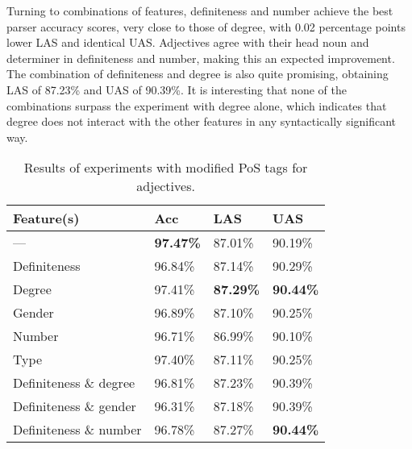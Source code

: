 \documentclass[11pt,a4paper]{article}
\begin{document}

Turning to combinations of features, definiteness and number achieve the best
parser accuracy scores, very close to those of degree, with 0.02 percentage
points lower LAS and identical UAS. Adjectives agree with their head noun and
determiner in definiteness and number, making this an expected improvement. The
combination of definiteness and degree is also quite promising, obtaining LAS
of 87.23\% and UAS of 90.39\%. It is interesting that none of the combinations
surpass the experiment with degree alone, which indicates that degree does not
interact with the other features in any syntactically significant way.

\begin{table}
    \centering
    \smaller[0.5]
    \begin{tabular}{@{}llll@{}}
        \toprule
        \textbf{Feature(s)} & \textbf{Acc} & \textbf{LAS} & \textbf{UAS}
        \\
        \midrule
        --- & \textbf{97.47\%} & 87.01\% & 90.19\% \\
        Definiteness & 96.84\% & 87.14\% & 90.29\% \\
        Degree & 97.41\% & \textbf{87.29\%} & \textbf{90.44\%} \\
        Gender & 96.89\% & 87.10\% & 90.25\% \\
        Number & 96.71\% & 86.99\% & 90.10\% \\
        Type & 97.40\% & 87.11\% & 90.25\% \\
        Definiteness \& degree & 96.81\% & 87.23\% & 90.39\% \\
        Definiteness \& gender & 96.31\% & 87.18\% & 90.39\% \\
        Definiteness \& number & 96.78\% & 87.27\% & \textbf{90.44\%} \\
        \bottomrule
    \end{tabular}
    \caption{Results of experiments with modified PoS tags for adjectives.}
    \label{adjresults}
\end{table}
\end{document}
